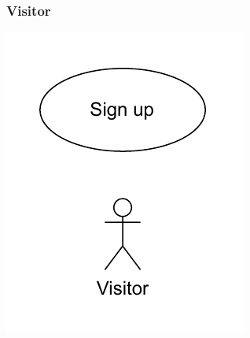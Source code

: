 \documentclass{beamer}
\begin{document}

\begin{frame}
    \frametitle{Visitor}
    \centering
    \includegraphics[width=0.3\linewidth]{drawio/visitor.pdf}
\end{frame}




\end{document}

